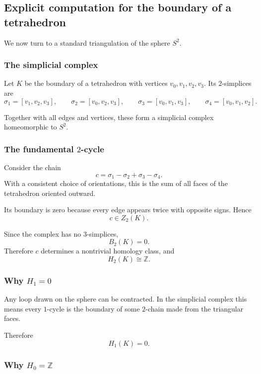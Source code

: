 \documentclass[12pt,a4paper]{article}
\theoremstyle{notespace}
\begin{document}
\subsection{Explicit computation for the boundary of a tetrahedron}

We now turn to a standard triangulation of the sphere \(S^2\).

\subsubsection{The simplicial complex}

Let \(K\) be the boundary of a tetrahedron with vertices \(v_0,v_1,v_2,v_3\). Its \(2\)-simplices are
\[
\sigma_1=[v_1,v_2,v_3],\qquad
\sigma_2=[v_0,v_2,v_3],\qquad
\sigma_3=[v_0,v_1,v_3],\qquad
\sigma_4=[v_0,v_1,v_2].
\]

Together with all edges and vertices, these form a simplicial complex homeomorphic to \(S^2\).

\subsubsection{The fundamental \texorpdfstring{$2$}{2}-cycle}

Consider the chain
\[
c=\sigma_1-\sigma_2+\sigma_3-\sigma_4.
\]
With a consistent choice of orientations, this is the sum of all faces of the tetrahedron oriented outward.

Its boundary is zero because every edge appears twice with opposite signs. Hence
\[
c\in Z_2(K).
\]

Since the complex has no \(3\)-simplices,
\[
B_2(K)=0.
\]
Therefore \(c\) determines a nontrivial homology class, and
\[
H_2(K)\cong \mathbb{Z}.
\]

\subsubsection{Why \texorpdfstring{$H_1=0$}{H1 = 0}}

Any loop drawn on the sphere can be contracted. In the simplicial complex this means every \(1\)-cycle is the boundary of some \(2\)-chain made from the triangular faces.

Therefore
\[
H_1(K)=0.
\]

\subsubsection{Why \texorpdfstring{$H_0=\mathbb{Z}$}{H0 = Z}}
\end{document}
